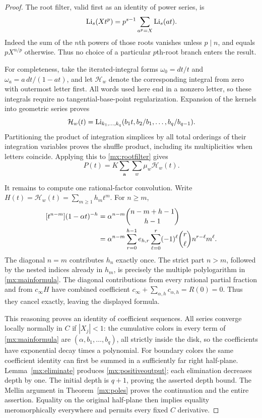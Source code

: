 \documentclass[11pt]{article}
\numberwithin{equation}{section}
\theoremstyle{definition}
\theoremstyle{remark}
\begin{document}
\begin{proof}
The root filter, valid first as an identity of power series, is
\begin{equation}\label{mx:rootfilter}
 \operatorname{Li}_s(Xt^p)=p^{s-1}\sum_{a^p=X}\operatorname{Li}_s(at).
\end{equation}
Indeed the sum of the $n$th powers of those roots vanishes unless
$p\mid n$, and equals $pX^{n/p}$ otherwise.  Thus no choice of a
particular $p$th-root branch enters the result.

For completeness, take the iterated-integral forms
$\omega_0=dt/t$ and $\omega_a=a\,dt/(1-at)$, and let
$\mathcal H_w$ denote the corresponding integral from zero with
outermost letter first.  All words used here end in a nonzero letter,
so these integrals require no tangential-base-point regularization.
Expansion of the kernels into geometric series proves
\begin{equation}\label{mx:hyperlog}
 \mathcal H_w(t)=
 \operatorname{Li}_{k_1,\ldots,k_q}
       (b_1t,b_2/b_1,\ldots,b_q/b_{q-1}).
\end{equation}
Partitioning the product of integration simplices by all total
orderings of their integration variables proves the shuffle product,
including its multiplicities when letters coincide.  Applying this
to \eqref{mx:rootfilter} gives
\[
 P(t)=K\sum_{\mathbf a}\sum_w\mu_w\mathcal H_w(t).
\]

It remains to compute one rational-factor convolution.  Write
$H(t)=\mathcal H_w(t)=\sum_{m\geq1}h_mt^m$.  For $n\geq m$,
\begin{align}\label{mx:binomial}
 [t^{n-m}](1-\alpha t)^{-h}
 &=\alpha^{n-m}\binom{n-m+h-1}{h-1}\notag\\
 &=\alpha^{n-m}\sum_{r=0}^{h-1}e_{h,r}
                   \sum_{\ell=0}^r(-1)^\ell\binom r\ell
                            n^{r-\ell}m^\ell.
\end{align}
The diagonal $n=m$ contributes $h_n$ exactly once.  The strict part
$n>m$, followed by the nested indices already in $h_m$, is precisely
the multiple polylogarithm in \eqref{mx:mainformula}.  The diagonal
contributions from every rational partial fraction and from
$c_\infty H$ have combined coefficient
$c_\infty+\sum_{\alpha,h}c_{\alpha,h}=R(0)=0$.  Thus they cancel
exactly, leaving the displayed formula.

This reasoning proves an identity of coefficient sequences.  All
series converge locally normally in $C$ if $|X_j|<1$: the cumulative
colors in every term of \eqref{mx:mainformula} are
$(\alpha,b_1,\ldots,b_q)$, all strictly inside the disk, so the
coefficients have exponential decay times a polynomial.  For boundary
colors the same coefficient identity can first be summed in a
sufficiently far right half-plane.  Lemma~\ref{mx:eliminate} produces
\eqref{mx:positiveoutput}; each elimination decreases depth by one.
The initial depth is $q+1$, proving the asserted depth bound.
The Mellin argument in Theorem~\ref{mx:poles} proves the continuation
and the entire assertion.  Equality on the original half-plane then
implies equality meromorphically everywhere and permits every fixed
$C$ derivative.
\end{proof}
\end{document}
